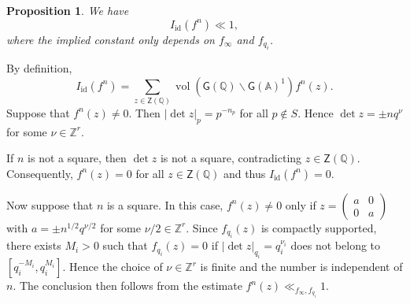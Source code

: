 \documentclass[10pt,oneside,reqno]{amsart}
\makeatletter
\renewcommand\AA{\mathbb{A}}
\newcommand\QQ{\mathbb{Q}}
\newcommand\ZZ{\mathbb{Z}}
\newcommand\G{\mathsf{G}}
\newcommand\Z{\mathsf{Z}}
\newcommand\bs{\backslash}
\newcommand\id{\mathrm{id}}
\DeclareMathOperator\vol{vol}
\theoremstyle{THEOREM}
\newtheorem{proposition}[theorem]{Proposition}
\theoremstyle{DEFINITION}
\theoremstyle{EXERCISE}
\numberwithin{equation}{section}
\renewenvironment{proof}[1][\proofname]{\par
  \vspace{-6pt}
  \pushQED{\qed}
  \normalfont \topsep6\p@\@plus6\p@\relax
  \trivlist
  \item[\hskip\labelsep\rmfamily\bfseries
    #1\@addpunct{:}]\ignorespaces
}{
  \popQED\endtrivlist\@endpefalse
  \vspace{-6pt}
}
\makeatother
\begin{document}
\begin{proposition}\label{prop:idestimate}
We have
\[
I_\mathrm{id}(f^n)\ll 1,
\]
where the implied constant only depends on $f_\infty$ and $f_{q_i}$.
\end{proposition}
\begin{proof}
By definition, 
\[
I_\id(f^n)=\sum_{z\in \Z(\QQ)}\vol(\G(\QQ)\bs \G(\AA)^1)f^n(z).
\] 
Suppose that $f^n(z)\neq 0$. Then $\mathopen{|}\det z\mathclose{|}_p=p^{-n_p}$ for all $p\notin S$. Hence $\det z=\pm nq^\nu$ for some $\nu\in \ZZ^r$. 

If $n$ is not a square, then $\det z$ is not a square, contradicting $z\in \Z(\QQ)$. Consequently, $f^n(z)= 0$ for all $z\in \Z(\QQ)$ and thus $I_\mathrm{id}(f^n)=0$.

Now suppose that $n$ is a square. In this case, $f^n(z)\neq 0$ only if $z=(\begin{smallmatrix} a & 0 \\  0 & a \end{smallmatrix})$ with $a=\pm n^{1/2}q^{\nu/2}$ for some $\nu/2\in \ZZ^r$. Since
$f_{q_i}(z)$ is compactly supported, there exists $M_i>0$ such that $f_{q_i}(z)=0$ if $\mathopen{|}\det z\mathclose{|}_{q_i}=q_i^{\nu_i}$ does not belong to $[q_i^{-M_i},q_i^{M_i}]$. Hence the choice of $\nu\in \ZZ^r$ is finite and the number is independent of $n$.  
The conclusion then follows from the estimate $f^n(z)\ll_{f_\infty,f_{q_i}} 1$.
\end{proof}
\end{document}
